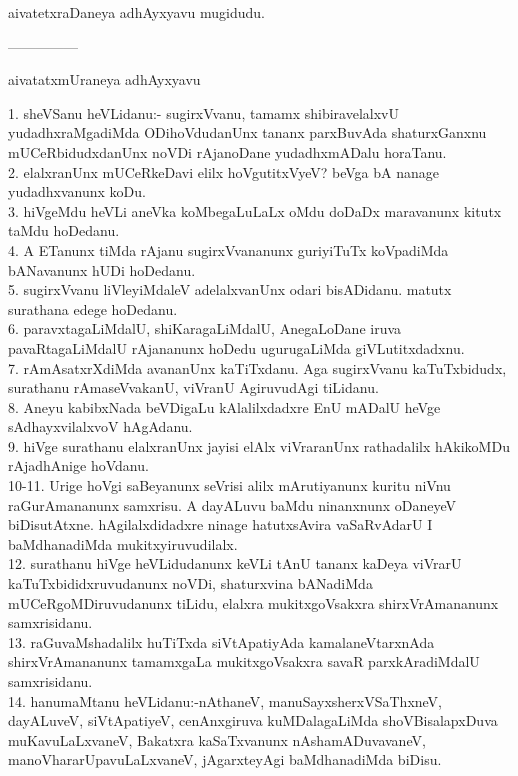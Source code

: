 \documentclass{article}
\begin{document}
\begin{center}
aivatetxraDaneya adhAyxyavu mugidudu.
\end{center}

\begin{center}
---------------
\end{center}

\begin{center}
aivatatxmUraneya adhAyxyavu
\end{center}

1. sheVSanu heVLidanu:- sugirxVvanu, tamamx shibiravelalxvU yudadhxraMgadiMda ODihoVdudanUnx tananx parxBuvAda shaturxGanxnu mUCeRbidudxdanUnx noVDi rAjanoDane yudadhxmADalu horaTanu.\\
2. elalxranUnx mUCeRkeDavi elilx hoVgutitxVyeV? beVga bA nanage yudadhxvanunx koDu.\\
3. hiVgeMdu heVLi aneVka koMbegaLuLaLx oMdu doDaDx maravanunx kitutx taMdu hoDedanu.\\
4. A ETanunx tiMda rAjanu sugirxVvananunx guriyiTuTx koVpadiMda bANavanunx hUDi hoDedanu.\\
5. sugirxVvanu liVleyiMdaleV adelalxvanUnx odari bisADidanu. matutx surathana edege hoDedanu.\\
6. paravxtagaLiMdalU, shiKaragaLiMdalU, AnegaLoDane iruva pavaRtagaLiMdalU rAjananunx hoDedu ugurugaLiMda giVLutitxdadxnu.\\
7. rAmAsatxrXdiMda avananUnx kaTiTxdanu. Aga sugirxVvanu kaTuTxbidudx, surathanu rAmaseVvakanU, viVranU AgiruvudAgi tiLidanu.\\
8. Aneyu kabibxNada beVDigaLu kAlalilxdadxre EnU mADalU heVge sAdhayxvilalxvoV hAgAdanu.\\
9. hiVge surathanu elalxranUnx jayisi elAlx viVraranUnx rathadalilx hAkikoMDu rAjadhAnige hoVdanu.\\
10-11. Urige hoVgi saBeyanunx seVrisi alilx mArutiyanunx kuritu niVnu raGurAmananunx samxrisu. A dayALuvu baMdu ninanxnunx oDaneyeV biDisutAtxne. hAgilalxdidadxre ninage hatutxsAvira vaSaRvAdarU I baMdhanadiMda mukitxyiruvudilalx.\\
12. surathanu hiVge heVLidudanunx keVLi tAnU tananx kaDeya viVrarU kaTuTxbididxruvudanunx noVDi, shaturxvina bANadiMda mUCeRgoMDiruvudanunx tiLidu, elalxra mukitxgoVsakxra shirxVrAmananunx samxrisidanu.\\
13. raGuvaMshadalilx huTiTxda siVtApatiyAda kamalaneVtarxnAda shirxVrAmananunx tamamxgaLa mukitxgoVsakxra savaR parxkAradiMdalU samxrisidanu.\\
14. hanumaMtanu heVLidanu:-nAthaneV, manuSayxsherxVSaThxneV, dayALuveV, siVtApatiyeV, cenAnxgiruva kuMDalagaLiMda shoVBisalapxDuva muKavuLaLxvaneV, Bakatxra kaSaTxvanunx nAshamADuvavaneV, manoVhararUpavuLaLxvaneV, jAgarxteyAgi baMdhanadiMda biDisu.\\
\end{document}
